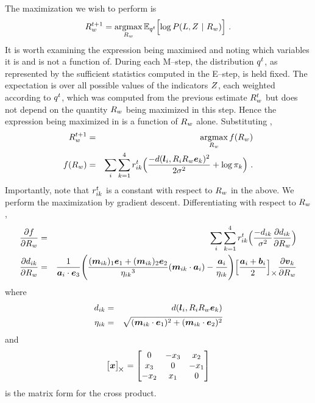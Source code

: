 The maximization we wish to perform is
\begin{equation}
  \label{eq:R-argmax}
  \SceneR^{t+1} = \argmax_{\SceneR}\limits
  \Expected_{\PosteriorEst^t}\Bigl[
    \log P(\LineSegs,\Indicators ~|~ \SceneR) 
  \Bigr] ~.
\end{equation}
It is worth examining the expression being maximised and noting which
variables it is and is not a function of. During each M--step, the
distribution $\PosteriorEst^t$, as represented by the sufficient
statistics computed in the E--step, is held fixed. The expectation is
over all possible values of the indicators $\Indicators$, each
weighted according to $\PosteriorEst^t$, which was computed from the
previous estimate $\SceneR^t$ but does not depend on the quantity
$\SceneR$ being maximized in this step. Hence the expression being
maximized in  is a function of $\SceneR$ alone. Substituting
,
\begin{eqnarray}
  \SceneR^{t+1} &=& \argmax_{\SceneR}\limits \ErrorFunc(\SceneR) \\
  \ErrorFunc(\SceneR) 
  &=&
  \label{eq:R-error}
  \sum_i \sum_{k=1}^4
  \Resp_{ik}^t
  \Bigl(
    \frac{-\dist(\LineSeg_i, \CamR_i\SceneR\ebasis_k)^2}{2\sigma^2}
    + \log \Mixing_k
  \Bigr)~.
\end{eqnarray}
Importantly, note that $\Resp_{ik}^t$ is a constant with respect to
$\SceneR$ in the above. We perform the maximization
 by gradient descent. Differentiating
 with respect to $\SceneR$,
\begin{eqnarray}
  \Deriv{\ErrorFunc}{\SceneR}
  &=&
  \sum_i \sum_{k=1}^4
  \Resp_{ik}^t
  \Bigl(
    \frac{-\dist_{ik}}{\sigma^2}
    \Deriv{\dist_{ik}}{\SceneR} 
  \Bigr)\\
  \Deriv{\dist_{ik}}{\SceneR} &=&
  \frac{1}{\StartPt_i \cdot \ez} 
  \Biggl(
    \frac
      {(\ReprojLine_{ik})_1\ex + (\ReprojLine_{ik})_2\ey}
      {{\eta_{ik}}^3}
    (\ReprojLine_{ik} \cdot \StartPt_i)
    -
    \frac{\StartPt_i}{\eta_{ik}}
  \Biggr)
  \Bigl[ \frac{\StartPt_i+\EndPt_i}{2} \Bigr]_{\cross}
  \Deriv{\vpt_k}{\SceneR}
\end{eqnarray} 
where
\begin{eqnarray}
  \dist_{ik} &=& \dist(\LineSeg_i, \CamR_i\SceneR\ebasis_k)\\
  \eta_{ik} &=&
   \sqrt{(\ReprojLine_{ik} \cdot \ex)^2 +
         (\ReprojLine_{ik} \cdot \ey)^2}
\end{eqnarray}
and
\begin{equation}
  \bigl[ \vect{x} \bigr]_{\!\cross} = 
  \begin{bmatrix}
    0 & -x_3 & x_2 \\
    x_3 & 0 & -x_1 \\
    -x_2 & x_1 & 0
  \end{bmatrix}
\end{equation}
is the matrix form for the cross product.

